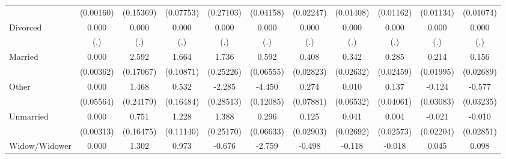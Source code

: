 {\begin{tabular}{l*{10}{c}}
                    &   (0.00160)         &   (0.15369)         &   (0.07753)         &   (0.27103)         &   (0.04158)         &   (0.02247)         &   (0.01408)         &   (0.01162)         &   (0.01134)         &   (0.01074)         \\
Divorced            &       0.000         &       0.000         &       0.000         &       0.000         &       0.000         &       0.000         &       0.000         &       0.000         &       0.000         &       0.000         \\
                    &         (.)         &         (.)         &         (.)         &         (.)         &         (.)         &         (.)         &         (.)         &         (.)         &         (.)         &         (.)         \\
Married             &       0.000         &       2.592\sym{***}&       1.664\sym{***}&       1.736\sym{***}&       0.592\sym{***}&       0.408\sym{***}&       0.342\sym{***}&       0.285\sym{***}&       0.214\sym{***}&       0.156\sym{***}\\
                    &   (0.00362)         &   (0.17067)         &   (0.10871)         &   (0.25226)         &   (0.06555)         &   (0.02823)         &   (0.02632)         &   (0.02459)         &   (0.01995)         &   (0.02689)         \\
Other               &       0.000         &       1.468\sym{***}&       0.532\sym{**} &      -2.285\sym{***}&      -4.450\sym{***}&       0.274\sym{***}&       0.010         &       0.137\sym{***}&      -0.124\sym{***}&      -0.577\sym{***}\\
                    &   (0.05564)         &   (0.24179)         &   (0.16484)         &   (0.28513)         &   (0.12085)         &   (0.07881)         &   (0.06532)         &   (0.04061)         &   (0.03083)         &   (0.03235)         \\
Unmarried           &       0.000         &       0.751\sym{***}&       1.228\sym{***}&       1.388\sym{***}&       0.296\sym{***}&       0.125\sym{***}&       0.041         &       0.004         &      -0.021         &      -0.010         \\
                    &   (0.00313)         &   (0.16475)         &   (0.11140)         &   (0.25170)         &   (0.06633)         &   (0.02903)         &   (0.02692)         &   (0.02573)         &   (0.02204)         &   (0.02851)         \\
Widow/Widower       &       0.000         &       1.302\sym{***}&       0.973\sym{***}&      -0.676\sym{*}  &      -2.759\sym{***}&      -0.498\sym{***}&      -0.118\sym{***}&      -0.018         &       0.045\sym{*}  &       0.098\sym{***}\\

\end{tabular}}

